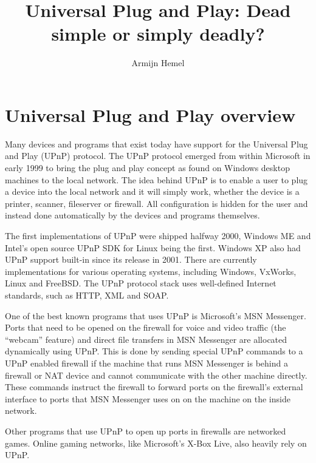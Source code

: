 \documentclass[10pt]{article}
\author{Armijn Hemel}
\title{Universal Plug and Play: Dead simple or simply deadly?}
\begin{document}
\maketitle
\thispagestyle{empty}

\section{Universal Plug and Play overview}

Many devices and programs that exist today have support for the Universal
Plug and Play (UPnP) protocol. The UPnP protocol emerged from within
Microsoft in early 1999 to bring the plug and play concept as found on
Windows desktop machines to the local network. The idea behind UPnP is to
enable a user to plug a device into the local network and it will simply
work, whether the device is a printer, scanner, fileserver or firewall.
All configuration is hidden for the user and instead done automatically by
the devices and programs themselves.

The first implementations of UPnP were shipped halfway 2000, Windows
ME and Intel's open source UPnP SDK for Linux being the first. Windows XP also had UPnP
support built-in since its release in 2001. There are currently
implementations for various operating systems, including Windows, VxWorks,
Linux\cite{libupnp}\cite{linux-igd} and FreeBSD\cite{libupnp}\cite{linux-igd}.
The UPnP protocol stack uses well-defined Internet standards, such as HTTP,
XML and SOAP.

One of the best known programs that uses UPnP is Microsoft's MSN Messenger.
Ports that need to be opened on the firewall for voice and video traffic
(the ``webcam'' feature) and direct file transfers in MSN Messenger are
allocated dynamically using UPnP. This is done by sending special UPnP commands
to a UPnP enabled firewall if the machine that runs MSN Messenger is behind
a firewall or NAT device and cannot communicate with the other machine
directly. These commands instruct the firewall to forward ports on the
firewall's external interface to ports that MSN Messenger uses on on the
machine on the inside network.

Other programs that use UPnP to open up ports in firewalls are networked
games. Online gaming networks, like Microsoft's X-Box Live, also heavily
rely on UPnP.
\end{document}
